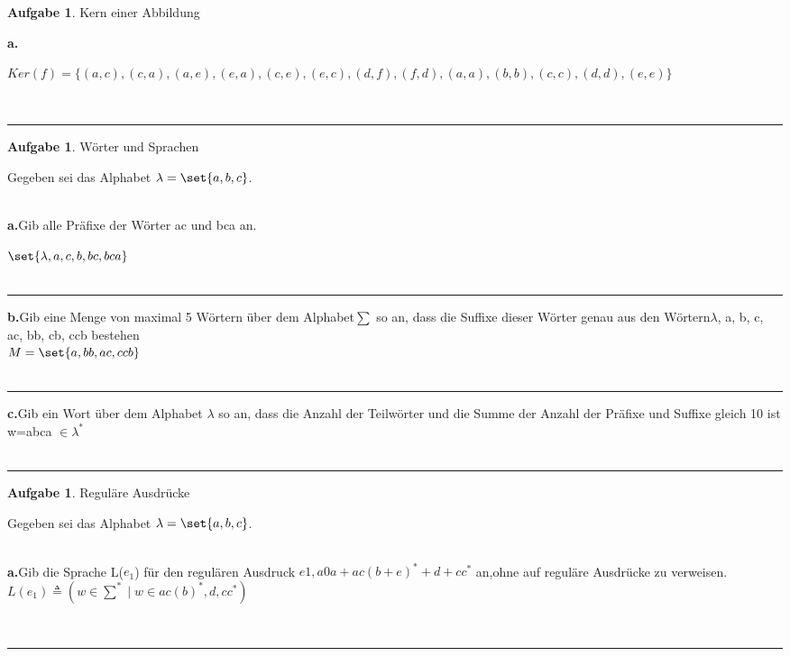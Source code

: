\documentclass[10pt,leqno ]{article}
\DeclarePairedDelimiter\set\{\}
\theoremstyle{definition}
\newtheorem{problem}[theorem]{Aufgabe}
\newenvironment{solution}[1][L]{\begin{doublespace}\textbf{#1.}\quad }{\ \rule{0.5em}{0.5em}\end{doublespace}}
\begin{document}
\begin{problem}
    Kern einer Abbildung
\end{problem}
\begin{solution}[a]
    
\( Ker(f) = \{ (a,c), (c,a), (a,e), (e,a), (c,e), (e,c), (d,f), (f,d), (a,a), (b,b), (c,c), (d,d), (e,e) \} \)

\end{solution}


\begin{problem}
    Wörter und Sprachen
\end{problem}
Gegeben sei das Alphabet \(\lambda = \set{ a, b, c }\).\\
\\
\begin{solution}[a]Gib alle Präfixe der Wörter ac und bca an.

 \(\set{\lambda ,a ,c ,b ,bc ,bca}  \)\\

\end{solution}
\begin{solution}[b]Gib eine Menge von maximal 5 Wörtern über dem Alphabet\(\sum\) so an, dass die Suffixe
dieser Wörter genau aus den Wörtern\(\lambda\), a, b, c, ac, bb, cb, ccb bestehen\\
\(M =\set{a, bb , ac, ccb}\)\\

\end{solution}
\begin{solution}[c]Gib ein Wort über dem Alphabet \(\lambda\) so an, dass die Anzahl der Teilwörter und die Summe
der Anzahl der Präfixe und Suffixe gleich 10 ist\\

w=abca \( \in \lambda^* \)\\
\end{solution}
\pagebreak
\begin{problem}
Reguläre Ausdrücke
\end{problem}
Gegeben sei das Alphabet \(\lambda = \set{ a, b, c }\).\\
\\
\begin{solution}[a]Gib die Sprache L(\(e_1\)) für den regulären Ausdruck \(e1 , a0a + ac (b + e)^* + d + cc^*\) an,ohne auf reguläre Ausdrücke zu verweisen. \\
\(L(e_1)   \triangleq (w \in \sum^* \mid w \in {ac(b)^*,d,cc^*})\)


\end{solution}
\end{document}
